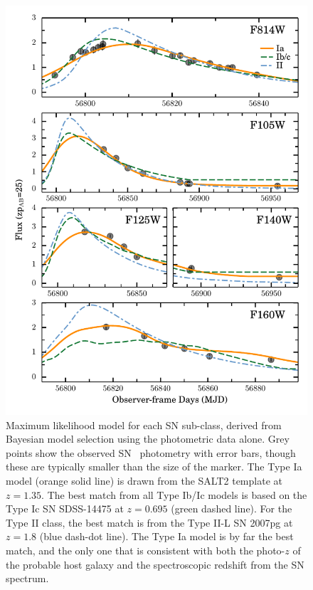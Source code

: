 \begin{figure}
\begin{center}
\includegraphics[width=\columnwidth]{FIG/snTomas_lightcurve_classification}
\caption{ 
Maximum likelihood model for each SN sub-class, derived from Bayesian
model selection using the photometric data alone. Grey points show the
observed SN \tomas\ photometry with error bars, though these are typically
smaller than the size of the marker.  The Type Ia model
(orange solid line) is drawn from the SALT2 template at $z=1.35$. The
best match from all Type Ib/Ic models is based on the Type Ic SN
SDSS-14475 at $z=0.695$ (green dashed line). For the Type II class, the
best match is from the Type II-L SN 2007pg at $z=1.8$ (blue dash-dot line). The Type
Ia model is by far the best match, and the only one that is consistent
with both the photo-$z$ of the probable host galaxy and the
spectroscopic redshift from the SN spectrum.
\label{fig:photoclass} }
\end{center}
\end{figure}

